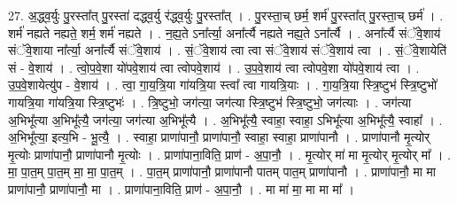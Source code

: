 \documentclass[17pt]{extarticle}
\begin{document}
27. अ॒द्ध्व॒र्युः पु॒रस्ता᳚त् पु॒रस्ता॑ दद्ध्व॒र्यु र॑द्ध्व॒र्युः पु॒रस्ता᳚त् । . पु॒रस्ता॒च् छर्म॒ शर्म॑ पु॒रस्ता᳚त् पु॒रस्ता॒च् छर्म॑ । . शर्म॑ नह्यते नह्यते॒ शर्म॒ शर्म॑ नह्यते । . न॒ह्य॒ते ऽना᳚र्त्या॒ अना᳚र्त्यै नह्यते नह्य॒ते ऽना᳚र्त्यै । . अना᳚र्त्यै संॅवे॒शाय॑ संॅवे॒शाया ना᳚र्त्या॒ अना᳚र्त्यै संॅवे॒शाय॑ । . सं॒ॅवे॒शाय॑ त्वा त्वा संॅवे॒शाय॑ संॅवे॒शाय॑ त्वा । . सं॒ॅवे॒शायेति॑ सं - वे॒शाय॑ । . त्वो॒प॒वे॒शा यो॑पवे॒शाय॑ त्वा त्वोपवे॒शाय॑ । . उ॒प॒वे॒शाय॑ त्वा त्वोपवे॒शा यो॑पवे॒शाय॑ त्वा । . उ॒प॒वे॒शायेत्यु॑प - वे॒शाय॑ । . त्वा॒ गा॒य॒त्रि॒या गा॑यत्रि॒या स्त्वा᳚ त्वा गायत्रि॒याः । . गा॒य॒त्रि॒या स्त्रि॒ष्टुभ॑ स्त्रि॒ष्टुभो॑ गायत्रि॒या गा॑यत्रि॒या स्त्रि॒ष्टुभः॑ । . त्रि॒ष्टुभो॒ जग॑त्या॒ जग॑त्या स्त्रि॒ष्टुभ॑ स्त्रि॒ष्टुभो॒ जग॑त्याः । . जग॑त्या अ॒भिभू᳚त्या अ॒भिभू᳚त्यै॒ जग॑त्या॒ जग॑त्या अ॒भिभू᳚त्यै । . अ॒भिभू᳚त्यै॒ स्वाहा॒ स्वाहा॒ ऽभिभू᳚त्या अ॒भिभू᳚त्यै॒ स्वाहा᳚ । . अ॒भिभू᳚त्या॒ इत्य॒भि - भू॒त्यै॒ । . स्वाहा॒ प्राणा॑पानौ॒ प्राणा॑पानौ॒ स्वाहा॒ स्वाहा॒ प्राणा॑पानौ । . प्राणा॑पानौ मृ॒त्योर् मृ॒त्योः प्राणा॑पानौ॒ प्राणा॑पानौ मृ॒त्योः । . प्राणा॑पाना॒विति॒ प्राण॑ - अ॒पा॒नौ॒ । . मृ॒त्योर् मा॑ मा मृ॒त्योर् मृ॒त्योर् मा᳚ । . मा॒ पा॒त॒म् पा॒त॒म् मा॒ मा॒ पा॒त॒म् । . पा॒त॒म् प्राणा॑पानौ॒ प्राणा॑पानौ पातम् पात॒म् प्राणा॑पानौ । . प्राणा॑पानौ॒ मा मा प्राणा॑पानौ॒ प्राणा॑पानौ॒ मा । . प्राणा॑पाना॒विति॒ प्राण॑ - अ॒पा॒नौ॒ । . मा मा॑ मा॒ मा मा मा᳚ । \newline
\end{document}
